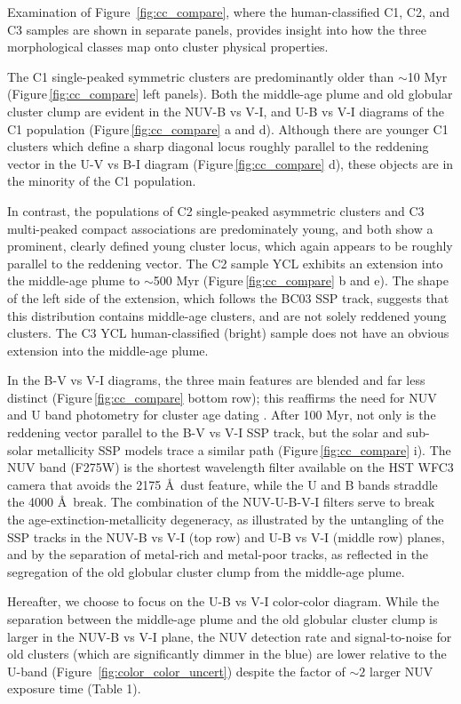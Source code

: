 \documentclass[]{aastex631}
\begin{document}
Examination of Figure~\ref{fig:cc_compare}, where the human-classified C1, C2, and C3 samples are shown in separate panels, provides insight into how the three morphological classes map onto cluster physical properties.  

The C1 single-peaked symmetric clusters are predominantly older than $\sim$10 Myr (Figure\,\ref{fig:cc_compare} left panels).  Both the middle-age plume and old globular cluster clump are evident in the NUV-B vs V-I, and U-B vs V-I diagrams of the C1 population (Figure\,\ref{fig:cc_compare} a and d). 
Although there are younger C1 clusters which define a sharp diagonal locus roughly parallel to the reddening vector in the U-V vs B-I diagram (Figure\,\ref{fig:cc_compare} d), these objects are in the minority of the C1 population.  

In contrast, the populations of C2 single-peaked asymmetric clusters and C3 multi-peaked compact associations are predominately young, and both show a prominent, clearly defined young cluster locus, which again appears to be roughly parallel to the reddening vector.  The C2 sample YCL exhibits an extension into the middle-age plume to $\sim$500 Myr (Figure\,\ref{fig:cc_compare} b and e).  The shape of the left side of the extension, which follows the BC03 SSP track, suggests that this distribution contains middle-age clusters, and are not solely reddened young clusters.  The C3 YCL human-classified (bright) sample does not have an obvious extension into the middle-age plume.

In the B-V vs V-I diagrams, the three main features are blended and far less distinct (Figure\,\ref{fig:cc_compare} bottom row); this reaffirms the need for NUV and U band photometry for cluster age dating \citep{smith_young_2007}. 
After 100 Myr, not only is the reddening vector parallel to the B-V vs V-I SSP track, but the solar and sub-solar metallicity SSP models trace a similar path (Figure\,\ref{fig:cc_compare} i).  The NUV band (F275W) is the shortest wavelength filter available on the HST WFC3 camera that avoids the 2175 \AA\ dust feature, while the U and B bands straddle the 4000 \AA\ break.  The combination of the NUV-U-B-V-I filters serve to break the age-extinction-metallicity degeneracy, as illustrated by the untangling of the SSP tracks in the NUV-B vs V-I (top row) and U-B vs V-I (middle row) planes, and by the separation of metal-rich and metal-poor tracks, as reflected in the segregation of the old globular cluster clump from the middle-age plume. 

Hereafter, we choose to focus on the U-B vs V-I color-color diagram.  While the separation between the middle-age plume and the old globular cluster clump is larger in the NUV-B vs V-I plane, the NUV detection rate and signal-to-noise for old clusters (which are significantly dimmer in the blue) are lower relative to the U-band (Figure~\ref{fig:color_color_uncert}) despite the factor of $\sim2$ larger NUV exposure time (Table 1).
\end{document}
